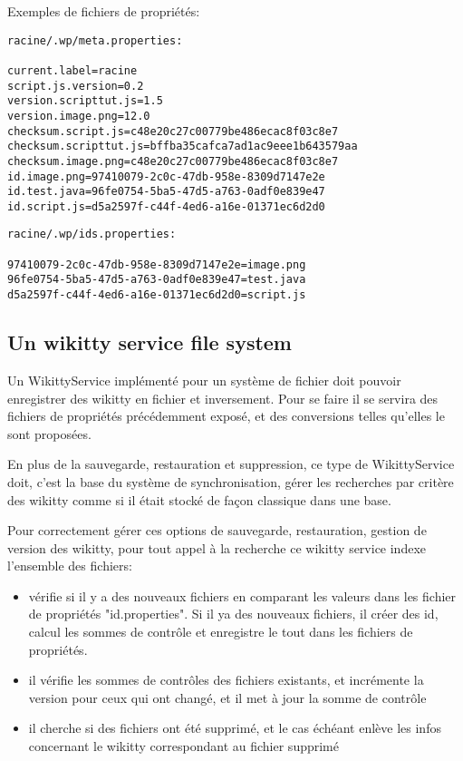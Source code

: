 Exemples de fichiers de propriétés:
\begin{verbatim}
racine/.wp/meta.properties:

current.label=racine
script.js.version=0.2
version.scripttut.js=1.5
version.image.png=12.0
checksum.script.js=c48e20c27c00779be486ecac8f03c8e7
checksum.scripttut.js=bffba35cafca7ad1ac9eee1b643579aa
checksum.image.png=c48e20c27c00779be486ecac8f03c8e7
id.image.png=97410079-2c0c-47db-958e-8309d7147e2e
id.test.java=96fe0754-5ba5-47d5-a763-0adf0e839e47
id.script.js=d5a2597f-c44f-4ed6-a16e-01371ec6d2d0
\end{verbatim}

\begin{verbatim}
racine/.wp/ids.properties:

97410079-2c0c-47db-958e-8309d7147e2e=image.png
96fe0754-5ba5-47d5-a763-0adf0e839e47=test.java
d5a2597f-c44f-4ed6-a16e-01371ec6d2d0=script.js
\end{verbatim}

\subsection{Un wikitty service file system}

Un WikittyService implémenté pour un système de fichier doit pouvoir enregistrer
des wikitty en fichier et inversement. Pour se faire il se servira des fichiers
de propriétés précédemment exposé, et des conversions telles qu'elles le sont
proposées.

En plus de la sauvegarde, restauration et suppression, ce type de WikittyService
doit, c'est la base du système de synchronisation, gérer les recherches par
critère des wikitty comme si il était stocké de façon classique dans une base.

Pour correctement gérer ces options de sauvegarde, restauration, gestion de
version des wikitty, pour tout appel à la recherche ce wikitty service indexe
l'ensemble des fichiers:
\begin{itemize}
\item vérifie si il y a des nouveaux fichiers en comparant les valeurs dans les
fichier de propriétés "id.properties". Si il ya des nouveaux fichiers, il créer
des id, calcul les sommes de contrôle et enregistre le tout dans les fichiers de
propriétés.
\item il vérifie les sommes de contrôles des fichiers existants, et incrémente la
version pour ceux qui ont changé, et il met à jour la somme de contrôle
\item il cherche si des fichiers ont été supprimé, et le cas échéant enlève les
infos concernant le wikitty correspondant au fichier supprimé
\end{itemize}

